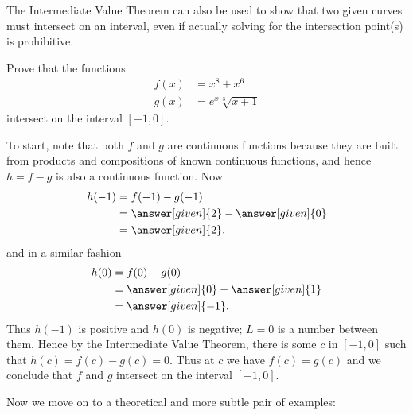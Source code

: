 \documentclass{ximera}
\begin{document}
The Intermediate Value Theorem can also be used to show that two given curves must intersect on an interval, even if actually solving for the intersection point(s) is prohibitive.


\begin{example} 
  Prove that the functions
  \begin{align*}
    f(x) &= x^8+x^6\\
    g(x) &= e^x\sqrt[3]{x+1}
  \end{align*}
  intersect on the interval $\left[-1,0\right]$.

  To start, note that both $f$ and $g$ are continuous functions because they are built from products and compositions of known continuous functions, and
  hence $h = f-g$ is also a continuous function. Now
  \begin{align*}
    h(-1) &= f(-1) - g(-1) \\
    &= \answer[given]{2} - \answer[given]{0}\\
    &= \answer[given]{2}.
  \end{align*}
  and in a similar fashion
   \begin{align*}
     h(0) &= f(0) - g(0) \\
    &= \answer[given]{0} - \answer[given]{1}\\
    &= \answer[given]{-1}.
   \end{align*}
 Thus $h(-1)$ is positive and $h(0)$ is negative; $L=0$ is a number between them. Hence by the Intermediate Value Theorem, there is some $c$ in $[-1,0]$ such that $h(c)=f(c)-g(c)=0$. Thus at $c$ we have $f(c)=g(c)$ and we conclude that $f$ and $g$
   intersect on the interval $\left[-1,0 \right]$.
\end{example}




Now we move on to a theoretical and more subtle pair of examples:
\end{document}
